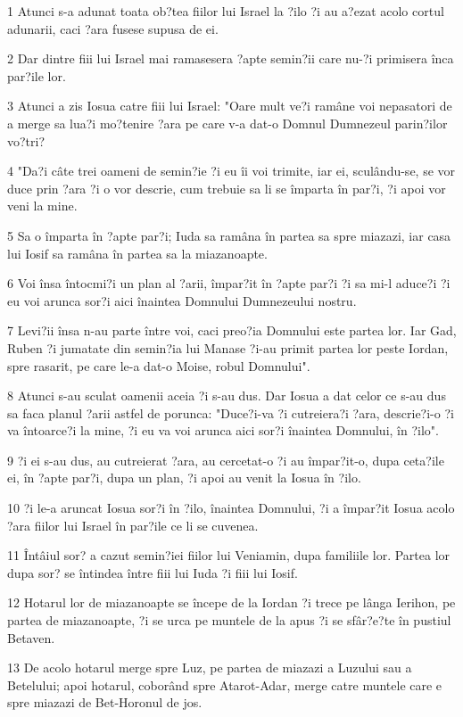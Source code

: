 \par 1 Atunci s-a adunat toata ob?tea fiilor lui Israel la ?ilo ?i au a?ezat acolo cortul adunarii, caci ?ara fusese supusa de ei.
\par 2 Dar dintre fiii lui Israel mai ramasesera ?apte semin?ii care nu-?i primisera înca par?ile lor.
\par 3 Atunci a zis Iosua catre fiii lui Israel: "Oare mult ve?i ramâne voi nepasatori de a merge sa lua?i mo?tenire ?ara pe care v-a dat-o Domnul Dumnezeul parin?ilor vo?tri?
\par 4 "Da?i câte trei oameni de semin?ie ?i eu îi voi trimite, iar ei, sculându-se, se vor duce prin ?ara ?i o vor descrie, cum trebuie sa li se împarta în par?i, ?i apoi vor veni la mine.
\par 5 Sa o împarta în ?apte par?i; Iuda sa ramâna în partea sa spre miazazi, iar casa lui Iosif sa ramâna în partea sa la miazanoapte.
\par 6 Voi însa întocmi?i un plan al ?arii, împar?it în ?apte par?i ?i sa mi-l aduce?i ?i eu voi arunca sor?i aici înaintea Domnului Dumnezeului nostru.
\par 7 Levi?ii însa n-au parte între voi, caci preo?ia Domnului este partea lor. Iar Gad, Ruben ?i jumatate din semin?ia lui Manase ?i-au primit partea lor peste Iordan, spre rasarit, pe care le-a dat-o Moise, robul Domnului".
\par 8 Atunci s-au sculat oamenii aceia ?i s-au dus. Dar Iosua a dat celor ce s-au dus sa faca planul ?arii astfel de porunca: "Duce?i-va ?i cutreiera?i ?ara, descrie?i-o ?i va întoarce?i la mine, ?i eu va voi arunca aici sor?i înaintea Domnului, în ?ilo".
\par 9 ?i ei s-au dus, au cutreierat ?ara, au cercetat-o ?i au împar?it-o, dupa ceta?ile ei, în ?apte par?i, dupa un plan, ?i apoi au venit la Iosua în ?ilo.
\par 10 ?i le-a aruncat Iosua sor?i în ?ilo, înaintea Domnului, ?i a împar?it Iosua acolo ?ara fiilor lui Israel în par?ile ce li se cuvenea.
\par 11 Întâiul sor? a cazut semin?iei fiilor lui Veniamin, dupa familiile lor. Partea lor dupa sor? se întindea între fiii lui Iuda ?i fiii lui Iosif.
\par 12 Hotarul lor de miazanoapte se începe de la Iordan ?i trece pe lânga Ierihon, pe partea de miazanoapte, ?i se urca pe muntele de la apus ?i se sfâr?e?te în pustiul Betaven.
\par 13 De acolo hotarul merge spre Luz, pe partea de miazazi a Luzului sau a Betelului; apoi hotarul, coborând spre Atarot-Adar, merge catre muntele care e spre miazazi de Bet-Horonul de jos.

